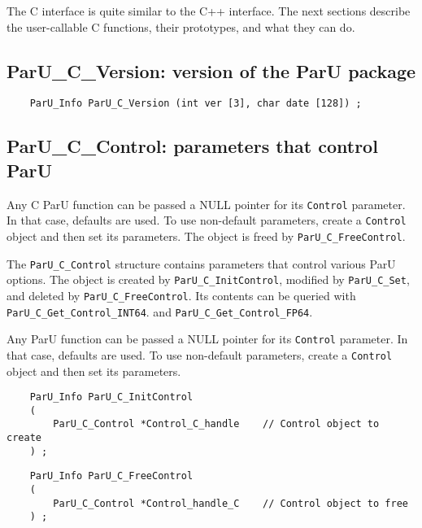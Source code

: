 \documentclass[12pt]{article}
\begin{document}
The C interface is quite similar to the C++ interface.  The next sections
describe the user-callable C functions, their prototypes, and what they can do.

\subsection{{\sf ParU\_C\_Version}: version of the ParU package}

    {\footnotesize
    \begin{verbatim}
    ParU_Info ParU_C_Version (int ver [3], char date [128]) ; \end{verbatim} }

\subsection{{\sf ParU\_C\_Control}: parameters that control ParU}

    Any C ParU function can be passed a NULL pointer for its \verb'Control'
    parameter.  In that case, defaults are used.  To use non-default
    parameters, create a \verb'Control' object and then set its parameters.
    The object is freed by \verb'ParU_C_FreeControl'.

    The \verb'ParU_C_Control' structure contains parameters that control
    various ParU options.  The object is created by \verb'ParU_C_InitControl',
    modified by \verb'ParU_C_Set', and deleted by \verb'ParU_C_FreeControl'.
    Its contents can be queried with \verb'ParU_C_Get_Control_INT64'.
    and \verb'ParU_C_Get_Control_FP64'.

    Any ParU function can be passed a NULL pointer for its \verb'Control'
    parameter.  In that case, defaults are used.  To use non-default
    parameters, create a \verb'Control' object and then set its parameters.

    {\footnotesize
    \begin{verbatim}
    ParU_Info ParU_C_InitControl
    (
        ParU_C_Control *Control_C_handle    // Control object to create
    ) ; \end{verbatim} }

    {\footnotesize
    \begin{verbatim}
    ParU_Info ParU_C_FreeControl
    (
        ParU_C_Control *Control_handle_C    // Control object to free
    ) ; \end{verbatim} }
\end{document}
